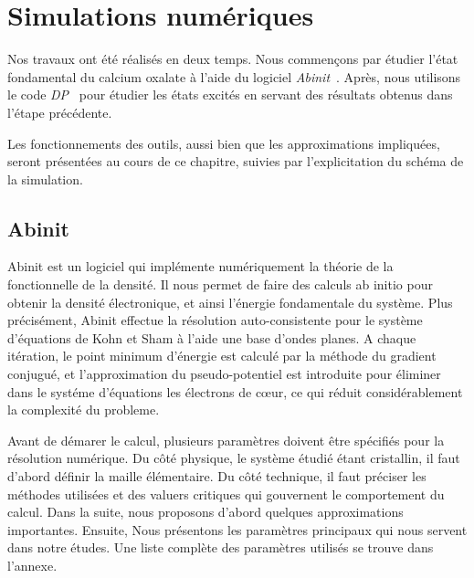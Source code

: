 \chapter{Simulations numériques}
\label{chap-simulation}
Nos travaux ont été réalisés en deux temps.
Nous commençons par étudier l'état fondamental du calcium oxalate à l'aide du logiciel \textit{Abinit}~\cite{Abinit}.
Après, nous utilisons le code \textit{DP}~\cite{DP} pour étudier les états excités
en servant des résultats obtenus dans l'étape précédente.

Les fonctionnements des outils, aussi bien que les approximations impliquées,
seront présentées au cours de ce chapitre, suivies par l'explicitation du schéma de la simulation.

\section{Abinit}
\label{sec-abinit}
Abinit est un logiciel qui implémente numériquement la théorie de la fonctionnelle de la densité.
Il nous permet de faire des calculs ab initio pour obtenir la densité électronique,
et ainsi l'énergie fondamentale du système.
Plus précisément, Abinit effectue la résolution auto-consistente pour le système d'équations de Kohn et Sham à l'aide une base d'ondes planes.
A chaque itération, le point minimum d'énergie est calculé par la méthode du gradient conjugué,
et l'approximation du pseudo-potentiel est introduite pour éliminer dans le systéme d'équations les électrons de cœur,
ce qui réduit considérablement la complexité du probleme.

Avant de démarer le calcul,
plusieurs paramètres doivent être spécifiés pour la résolution numérique.
Du côté physique, le système étudié étant cristallin,
il faut d'abord définir la maille élémentaire.
Du côté technique, il faut préciser les méthodes utilisées et des valuers critiques qui gouvernent le comportement du calcul.
Dans la suite, nous proposons d'abord quelques approximations importantes. Ensuite,
Nous présentons les paramètres principaux qui nous servent dans notre études.
Une liste complète des paramètres utilisés se trouve dans l'annexe.

